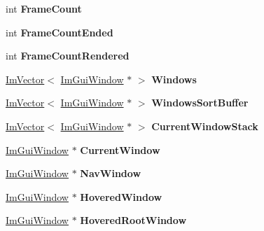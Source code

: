 \begin{DoxyCompactItemize}
int {\bfseries Frame\+Count}
\item 
\mbox{\label{struct_im_gui_context_aa4cc3099c789be981d665c617b6d78a9}} 
int {\bfseries Frame\+Count\+Ended}
\item 
\mbox{\label{struct_im_gui_context_a64a96ecd43f4b10c1fec8eb3fc9bff89}} 
int {\bfseries Frame\+Count\+Rendered}
\item 
\mbox{\label{struct_im_gui_context_a0f59a9a861d097be066c6cc106e40f3e}} 
\hyperlink{class_im_vector}{Im\+Vector}$<$ \hyperlink{struct_im_gui_window}{Im\+Gui\+Window} $\ast$ $>$ {\bfseries Windows}
\item 
\mbox{\label{struct_im_gui_context_af33de778de28b057fa7a42e4cbe0017a}} 
\hyperlink{class_im_vector}{Im\+Vector}$<$ \hyperlink{struct_im_gui_window}{Im\+Gui\+Window} $\ast$ $>$ {\bfseries Windows\+Sort\+Buffer}
\item 
\mbox{\label{struct_im_gui_context_a19020a20e7bca2fadbb287106b92891b}} 
\hyperlink{class_im_vector}{Im\+Vector}$<$ \hyperlink{struct_im_gui_window}{Im\+Gui\+Window} $\ast$ $>$ {\bfseries Current\+Window\+Stack}
\item 
\mbox{\label{struct_im_gui_context_aa923044f396241668aef5ed2f4c4d847}} 
\hyperlink{struct_im_gui_window}{Im\+Gui\+Window} $\ast$ {\bfseries Current\+Window}
\item 
\mbox{\label{struct_im_gui_context_ae06077e45c894488b28baaf2d7ff8e41}} 
\hyperlink{struct_im_gui_window}{Im\+Gui\+Window} $\ast$ {\bfseries Nav\+Window}
\item 
\mbox{\label{struct_im_gui_context_a6dd89693704216a036d2676b8c6610f8}} 
\hyperlink{struct_im_gui_window}{Im\+Gui\+Window} $\ast$ {\bfseries Hovered\+Window}
\item 
\mbox{\label{struct_im_gui_context_ae5dcb8bed41ff948af2cfba6c9ae36d9}} 
\hyperlink{struct_im_gui_window}{Im\+Gui\+Window} $\ast$ {\bfseries Hovered\+Root\+Window}
\item 
\mbox{\label{struct_im_gui_context_a32bef5a7740179ad8076643b001f15e4}} 

\end{DoxyCompactItemize}
